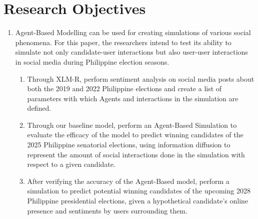 \section{Research Objectives}
\begin{enumerate}
    \item Agent-Based Modelling can be used for creating simulations of various social phenomena. For this paper, the researchers intend to test its ability to simulate not only candidate-user interactions but also user-user interactions in social media during Philippine election seasons.
    \begin{enumerate}
        \item Through XLM-R, perform sentiment analysis on social media posts about both the 2019 and 2022 Philippine elections and create a list of parameters with which Agents and interactions in the simulation are defined.
        \item Through our baseline model, perform an Agent-Based Simulation to evaluate the efficacy of the model to predict winning candidates of the 2025 Philippine senatorial elections, using information diffusion to represent the amount of social interactions done in the simulation with respect to a given candidate.
        \item After verifying the accuracy of the Agent-Based model, perform a simulation to predict potential winning candidates of the upcoming 2028 Philippine presidential elections, given a hypothetical candidate’s online presence and sentiments by users surrounding them.
    \end{enumerate}
\end{enumerate}